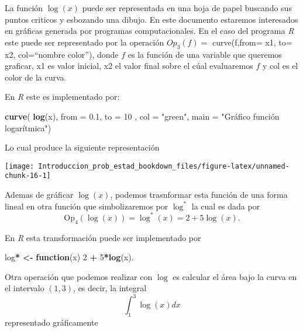 \documentclass[]{book}
\newenvironment{Shaded}{\begin{snugshade}}{\end{snugshade}}
\newcommand{\ControlFlowTok}[1]{\textcolor[rgb]{0.13,0.29,0.53}{\textbf{#1}}}
\newcommand{\DataTypeTok}[1]{\textcolor[rgb]{0.13,0.29,0.53}{#1}}
\newcommand{\DecValTok}[1]{\textcolor[rgb]{0.00,0.00,0.81}{#1}}
\newcommand{\ErrorTok}[1]{\textcolor[rgb]{0.64,0.00,0.00}{\textbf{#1}}}
\newcommand{\FloatTok}[1]{\textcolor[rgb]{0.00,0.00,0.81}{#1}}
\newcommand{\KeywordTok}[1]{\textcolor[rgb]{0.13,0.29,0.53}{\textbf{#1}}}
\newcommand{\NormalTok}[1]{#1}
\newcommand{\OperatorTok}[1]{\textcolor[rgb]{0.81,0.36,0.00}{\textbf{#1}}}
\newcommand{\StringTok}[1]{\textcolor[rgb]{0.31,0.60,0.02}{#1}}
\theoremstyle{definition}
\theoremstyle{definition}
\theoremstyle{definition}
\theoremstyle{remark}
\begin{document}
La función \(\log(x)\) puede ser representada en una hoja de
papel buscando sus puntos criticos y esbozando una dibujo. En
este documento estaremos interesados en gráficas generada
por programas computacionales. En el caso del programa \emph{R}
este puede ser representado por la operación \(Op_3(f)=\)
curve(f,from= x1, to= x2, col=``nombre color''), donde \(f\) es la
función de una variable que queremos graficar, x1 es valor
inicial, x2 el valor final sobre el cúal evaluaremos \(f\) y col es
el color de la curva.

En \emph{R} este es implementado por:

\begin{Shaded}
\begin{Highlighting}[]
   \KeywordTok{curve}\NormalTok{( }\KeywordTok{log}\NormalTok{(x), }\DataTypeTok{from =} \FloatTok{0.1}\NormalTok{, }\DataTypeTok{to =} \DecValTok{10}\NormalTok{ , }\DataTypeTok{col =} \StringTok{"green"}\NormalTok{, }\DataTypeTok{main =} \StringTok{"Gráfico función logarítmica"}\NormalTok{)}
\end{Highlighting}
\end{Shaded}

Lo cual produce la siguiente representación

\begin{center}\texttt{[image: Introduccion\_prob\_estad\_bookdown\_files/figure-latex/unnamed-chunk-16-1]} \end{center}

Ademas de gráficar \(\log(x)\), podemos trasnformar esta
función de una forma lineal en otra función que
simbolizaremos por \(\log^{*}\) la cual es dada por
\[ \mbox{Op}_4(\log(x)) = \log^{*}(x) = 2 + 5\log(x).\]

En \emph{R} esta transformación puede ser implementado por

\begin{Shaded}
\begin{Highlighting}[]
\NormalTok{  log}\OperatorTok{*}\StringTok{ }\ErrorTok{<}\OperatorTok{-}\StringTok{ }\ControlFlowTok{function}\NormalTok{(x) }\DecValTok{2} \OperatorTok{+}\StringTok{ }\DecValTok{5}\OperatorTok{*}\KeywordTok{log}\NormalTok{(x).}
\end{Highlighting}
\end{Shaded}

Otra operación que podemos realizar con \(\log\) es calcular el
área bajo la curva en el intervalo
\((1,3)\), es decir, la integral \[\int_{1}^{3} \log(x)dx\]
representado gráficamente
\end{document}
